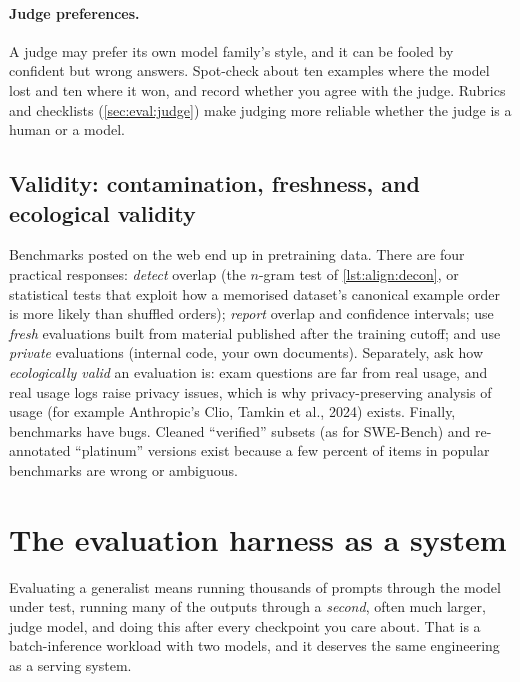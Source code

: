 \paragraph{Judge preferences.} A judge may prefer its own model family's style, and it can be
fooled by confident but wrong answers. Spot-check about ten examples where the model lost and ten
where it won, and record whether you agree with the judge. Rubrics and checklists
(\cref{sec:eval:judge}) make judging more reliable whether the judge is a human or a model.

\subsection{Validity: contamination, freshness, and ecological validity}

Benchmarks posted on the web end up in pretraining data. There are four practical responses:
\emph{detect} overlap (the $n$-gram test of \cref{lst:align:decon}, or statistical tests that
exploit how a memorised dataset's canonical example order is more likely than shuffled
orders); \emph{report} overlap and confidence intervals; use \emph{fresh} evaluations built
from material published after the training cutoff; and use \emph{private} evaluations (internal
code, your own documents). Separately, ask how \emph{ecologically valid} an evaluation is: exam
questions are far from real usage, and real usage logs raise privacy issues, which is why
privacy-preserving analysis of usage (for example Anthropic's Clio, Tamkin et al., 2024)
exists. Finally, benchmarks have bugs. Cleaned ``verified'' subsets (as for SWE-Bench) and
re-annotated ``platinum'' versions exist because a few percent of items in popular benchmarks
are wrong or ambiguous.

\section{The evaluation harness as a system}\label{sec:align:harness}

Evaluating a generalist means running thousands of prompts through the model under test,
running many of the outputs through a \emph{second}, often much larger, judge model, and doing this
after every checkpoint you care about. That is a batch-inference workload with two models,
and it deserves the same engineering as a serving system.

